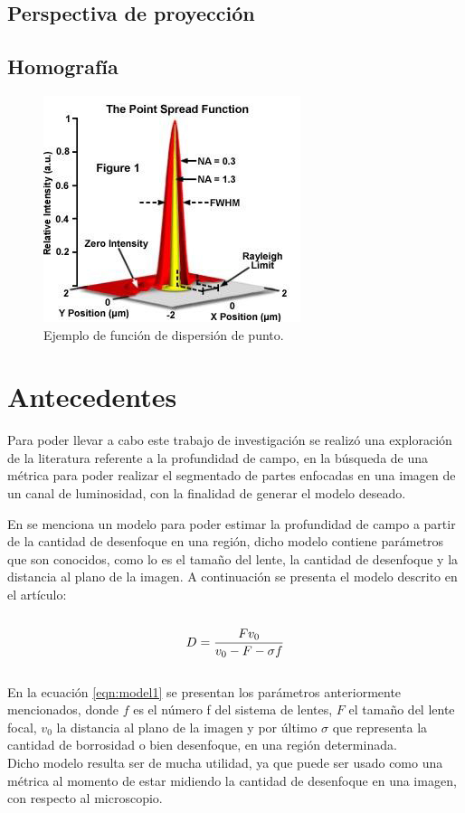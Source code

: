 \subsection{Perspectiva de proyección}

\subsection{Homografía}    
    
\begin{figure}[ht]
    \centering
    \includegraphics[scale=1]{GraficosEdArt/psfintrofigure1.jpg} 
    \caption{Ejemplo de función de dispersión de punto.\citep{ruttenfusser_wilson_davidson}}
    \label{psfDemo}
\end{figure}
        
\section{Antecedentes}
    Para poder llevar a cabo este trabajo de investigación se realizó una exploración de la literatura referente a la profundidad de campo, en la búsqueda de una métrica para poder realizar el segmentado de partes enfocadas en una imagen de un canal de luminosidad, con la finalidad de generar el modelo deseado.

    En \citet{Pentland} se menciona un modelo para poder estimar la profundidad de campo a partir de la cantidad de desenfoque en una región, dicho modelo contiene parámetros que son conocidos, como lo es el tamaño del lente, la cantidad de desenfoque y la distancia al plano de la imagen. A continuación se presenta el modelo descrito en el artículo:\\
\\
\begin{equation} \label{eqn:model1}
\large D = \frac{F v_{0}}{v_{0} - F - \sigma f}
\end{equation}
\\
En la ecuación  \ref{eqn:model1} se presentan los parámetros anteriormente mencionados, donde $f$ es el número f del sistema de lentes, $F$ el tamaño del lente focal, $v_{0}$ la distancia al plano de la imagen y por último $\sigma$ que representa la cantidad de borrosidad o bien desenfoque, en una región determinada.
\\
Dicho modelo resulta ser de mucha utilidad, ya que puede ser usado como una métrica al momento de estar midiendo la cantidad de desenfoque en una imagen, con respecto al microscopio.

